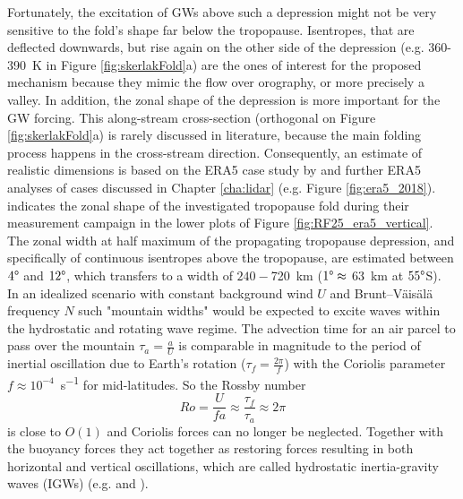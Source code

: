 Fortunately, the excitation of GWs above such a depression might not be very sensitive to the fold's shape far below the tropopause. Isentropes, that are deflected downwards, but rise again on the other side of the depression (e.g. 360-\SI{390}{\kelvin} in Figure \ref{fig:skerlakFold}a) are the ones of interest for the proposed mechanism because they mimic the flow over orography, or more precisely a valley. In addition, the zonal shape of the depression is more important for the GW forcing. This along-stream cross-section (orthogonal on Figure \ref{fig:skerlakFold}a) is rarely discussed in literature, because the main folding process happens in the cross-stream direction. Consequently, an estimate of realistic dimensions is based on the ERA5 case study by \textcite{dornbrack_stratospheric_2022} and further ERA5 analyses of cases discussed in Chapter \ref{cha:lidar} (e.g. Figure \ref{fig:era5_2018}). \textcite{dornbrack_stratospheric_2022} indicates the zonal shape of the investigated tropopause fold during their measurement campaign in the lower plots of Figure \ref{fig:RF25_era5_vertical}. The zonal width at half maximum of the propagating tropopause depression, and specifically of continuous isentropes above the tropopause, are estimated between $4 \degree$ and $12 \degree$, which transfers to a width of $240-$\SI{720}{\kilo\meter} ($1\degree \approx$ \SI{63}{\kilo\meter} at $55 \degree$S). \\
In an idealized scenario with constant background wind $U$ and Brunt–Väisälä frequency $N$ such "mountain widths" would be expected to excite waves within the hydrostatic and rotating wave regime. The advection time for an air parcel to pass over the mountain $\tau_a = \frac{a}{U}$ is comparable in magnitude to the period of inertial oscillation due to Earth’s rotation ($\tau_f = \frac{2 \pi}{f}$) with the Coriolis parameter $f \approx 10^{-4}$\SI{}{\second^{-1}} for mid-latitudes. So the Rossby number
\begin{equation}
    Ro = \frac{U}{f a} \approx \frac{\tau_f}{\tau_a} \approx 2 \pi
\end{equation}
%
is close to $O(1)$ and Coriolis forces can no longer be neglected. Together with the buoyancy forces they act together as restoring forces resulting in both horizontal and vertical oscillations, which are called hydrostatic inertia-gravity waves (IGWs) (e.g. \cite{gill_atmosphere-ocean_1982} and \cite{lin_mesoscale_2007}).

